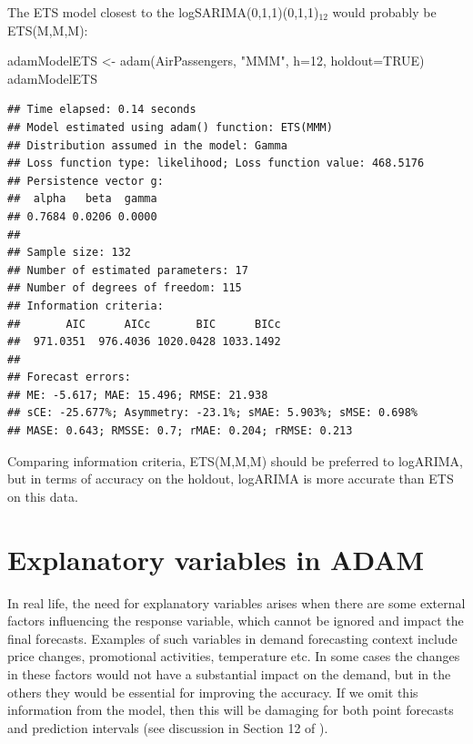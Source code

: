 \documentclass[
]{book}
\newenvironment{Shaded}{\begin{snugshade}}{\end{snugshade}}
\newcommand{\AttributeTok}[1]{\textcolor[rgb]{0.77,0.63,0.00}{#1}}
\newcommand{\ConstantTok}[1]{\textcolor[rgb]{0.00,0.00,0.00}{#1}}
\newcommand{\DecValTok}[1]{\textcolor[rgb]{0.00,0.00,0.81}{#1}}
\newcommand{\FunctionTok}[1]{\textcolor[rgb]{0.00,0.00,0.00}{#1}}
\newcommand{\NormalTok}[1]{#1}
\newcommand{\OtherTok}[1]{\textcolor[rgb]{0.56,0.35,0.01}{#1}}
\newcommand{\StringTok}[1]{\textcolor[rgb]{0.31,0.60,0.02}{#1}}
\theoremstyle{definition}
\theoremstyle{definition}
\theoremstyle{definition}
\theoremstyle{definition}
\theoremstyle{remark}
\begin{document}
The ETS model closest to the logSARIMA(0,1,1)(0,1,1)\(_{12}\) would probably be ETS(M,M,M):

\begin{Shaded}
\begin{Highlighting}[]
\NormalTok{adamModelETS }\OtherTok{\textless{}{-}} \FunctionTok{adam}\NormalTok{(AirPassengers, }\StringTok{"MMM"}\NormalTok{, }\AttributeTok{h=}\DecValTok{12}\NormalTok{, }\AttributeTok{holdout=}\ConstantTok{TRUE}\NormalTok{)}
\NormalTok{adamModelETS}
\end{Highlighting}
\end{Shaded}

\begin{verbatim}
## Time elapsed: 0.14 seconds
## Model estimated using adam() function: ETS(MMM)
## Distribution assumed in the model: Gamma
## Loss function type: likelihood; Loss function value: 468.5176
## Persistence vector g:
##  alpha   beta  gamma 
## 0.7684 0.0206 0.0000 
## 
## Sample size: 132
## Number of estimated parameters: 17
## Number of degrees of freedom: 115
## Information criteria:
##       AIC      AICc       BIC      BICc 
##  971.0351  976.4036 1020.0428 1033.1492 
## 
## Forecast errors:
## ME: -5.617; MAE: 15.496; RMSE: 21.938
## sCE: -25.677%; Asymmetry: -23.1%; sMAE: 5.903%; sMSE: 0.698%
## MASE: 0.643; RMSSE: 0.7; rMAE: 0.204; rRMSE: 0.213
\end{verbatim}

Comparing information criteria, ETS(M,M,M) should be preferred to logARIMA, but in terms of accuracy on the holdout, logARIMA is more accurate than ETS on this data.

\hypertarget{ADAMX}{%
\chapter{Explanatory variables in ADAM}\label{ADAMX}}

In real life, the need for explanatory variables arises when there are some external factors influencing the response variable, which cannot be ignored and impact the final forecasts. Examples of such variables in demand forecasting context include price changes, promotional activities, temperature etc. In some cases the changes in these factors would not have a substantial impact on the demand, but in the others they would be essential for improving the accuracy. If we omit this information from the model, then this will be damaging for both point forecasts and prediction intervals (see discussion in Section 12 of \citet{SvetunkovSBA}).
\end{document}

